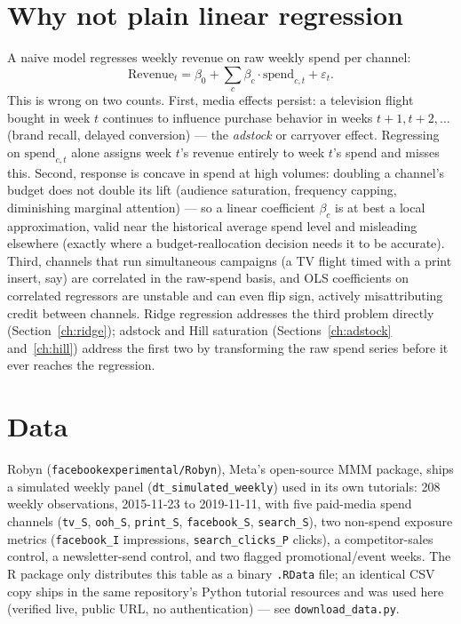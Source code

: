 \documentclass[11pt]{report}
\begin{document}
\section{Why not plain linear regression}
A naive model regresses weekly revenue on raw weekly spend per channel:
\[
  \text{Revenue}_t = \beta_0 + \sum_{c} \beta_c \cdot \text{spend}_{c,t} + \varepsilon_t.
\]
This is wrong on two counts. First, media effects persist: a television flight bought in
week $t$ continues to influence purchase behavior in weeks $t+1, t+2, \dots$ (brand
recall, delayed conversion) --- the \emph{adstock} or carryover effect. Regressing on
$\text{spend}_{c,t}$ alone assigns week $t$'s revenue entirely to week $t$'s spend and
misses this. Second, response is concave in spend at high volumes: doubling a channel's
budget does not double its lift (audience saturation, frequency capping, diminishing
marginal attention) --- so a linear coefficient $\beta_c$ is at best a local
approximation, valid near the historical average spend level and misleading elsewhere
(exactly where a budget-reallocation decision needs it to be accurate). Third, channels
that run simultaneous campaigns (a TV flight timed with a print insert, say) are
correlated in the raw-spend basis, and OLS coefficients on correlated regressors are
unstable and can even flip sign, actively misattributing credit between channels. Ridge
regression addresses the third problem directly (Section~\ref{ch:ridge}); adstock and
Hill saturation (Sections~\ref{ch:adstock} and~\ref{ch:hill}) address the first two by
transforming the raw spend series before it ever reaches the regression.

\section{Data}
\label{sec:data}
Robyn (\texttt{facebookexperimental/Robyn}), Meta's open-source MMM package, ships a
simulated weekly panel (\texttt{dt\_simulated\_weekly}) used in its own tutorials: 208
weekly observations, 2015-11-23 to 2019-11-11, with five paid-media spend channels
(\texttt{tv\_S}, \texttt{ooh\_S}, \texttt{print\_S}, \texttt{facebook\_S},
\texttt{search\_S}), two non-spend exposure metrics (\texttt{facebook\_I} impressions,
\texttt{search\_clicks\_P} clicks), a competitor-sales control, a newsletter-send
control, and two flagged promotional/event weeks. The R package only distributes this
table as a binary \texttt{.RData} file; an identical CSV copy ships in the same
repository's Python tutorial resources and was used here (verified live, public URL, no
authentication) --- see \texttt{download\_data.py}.
\end{document}
